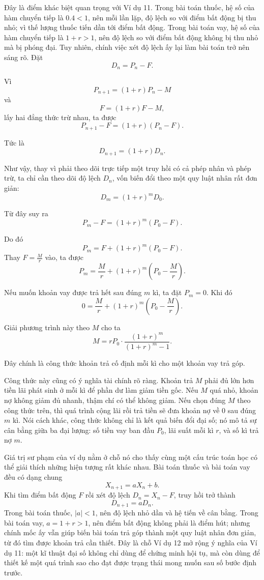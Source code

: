 {    Đây là điểm khác biệt quan trọng với Ví dụ 11. Trong bài toán thuốc, hệ số của hàm chuyển tiếp là $0.4<1$, nên mỗi lần lặp, độ lệch so với điểm bất động bị thu nhỏ; vì thế lượng thuốc tiến dần tới điểm bất động. Trong bài toán vay, hệ số của hàm chuyển tiếp là $1+r>1$, nên độ lệch so với điểm bất động không bị thu nhỏ mà bị phóng đại. Tuy nhiên, chính việc xét độ lệch ấy lại làm bài toán trở nên sáng rõ. Đặt
    $$
    D_n=P_n-F.
    $$

    Vì
    $$
    P_{n+1}=(1+r)P_n-M
    $$
    và
    $$
    F=(1+r)F-M,
    $$
    lấy hai đẳng thức trừ nhau, ta được
    $$
    P_{n+1}-F=(1+r)(P_n-F).
    $$
    
    Tức là
    $$
    D_{n+1}=(1+r)D_n.
    $$

    Như vậy, thay vì phải theo dõi trực tiếp một truy hồi có cả phép nhân và phép trừ, ta chỉ cần theo dõi độ lệch $D_n$, vốn biến đổi theo một quy luật nhân rất đơn giản:
    $$
    D_m=(1+r)^mD_0.
    $$

    Từ đây suy ra
    $$
    P_m-F=(1+r)^m(P_0-F).
    $$

    Do đó
    $$
    P_m=F+(1+r)^m(P_0-F).
    $$
    Thay $F=\frac{M}{r}$ vào, ta được
    $$
    P_m=\frac{M}{r}+(1+r)^m\left(P_0-\frac{M}{r}\right).
    $$

    Nếu muốn khoản vay được trả hết sau đúng $m$ kì, ta đặt $P_m=0$. Khi đó
    $$
    0=\frac{M}{r}+(1+r)^m\left(P_0-\frac{M}{r}\right).
    $$

    Giải phương trình này theo $M$ cho ta
    $$
    M=rP_0\cdot \frac{(1+r)^m}{(1+r)^m-1}.
    $$

    Đây chính là công thức khoản trả cố định mỗi kì cho một khoản vay trả góp.

    Công thức này cũng có ý nghĩa tài chính rõ ràng. Khoản trả $M$ phải đủ lớn hơn tiền lãi phát sinh ở mỗi kì để phần dư làm giảm tiền gốc. Nếu $M$ quá nhỏ, khoản nợ không giảm đủ nhanh, thậm chí có thể không giảm. Nếu chọn đúng $M$ theo công thức trên, thì quá trình cộng lãi rồi trả tiền sẽ đưa khoản nợ về $0$ sau đúng $m$ kì. Nói cách khác, công thức không chỉ là kết quả biến đổi đại số; nó mô tả sự cân bằng giữa ba đại lượng: số tiền vay ban đầu $P_0$, lãi suất mỗi kì $r$, và số kì trả nợ $m$.

    Giá trị sư phạm của ví dụ nằm ở chỗ nó cho thấy cùng một cấu trúc toán học có thể giải thích những hiện tượng rất khác nhau. Bài toán thuốc và bài toán vay đều có dạng chung
    $$
    X_{n+1}=aX_n+b.
    $$
    Khi tìm điểm bất động $F$ rồi xét độ lệch $D_n=X_n-F$, truy hồi trở thành
    $$
    D_{n+1}=aD_n.
    $$
    Trong bài toán thuốc, $|a|<1$, nên độ lệch nhỏ dần và hệ tiến về cân bằng. Trong bài toán vay, $a=1+r>1$, nên điểm bất động không phải là điểm hút; nhưng chính mốc ấy vẫn giúp biến bài toán trả góp thành một quy luật nhân đơn giản, từ đó tìm được khoản trả cần thiết. Đây là chỗ Ví dụ 12 mở rộng ý nghĩa của Ví dụ 11: một kĩ thuật đại số không chỉ dùng để chứng minh hội tụ, mà còn dùng để thiết kế một quá trình sao cho đạt được trạng thái mong muốn sau số bước định trước.

}
